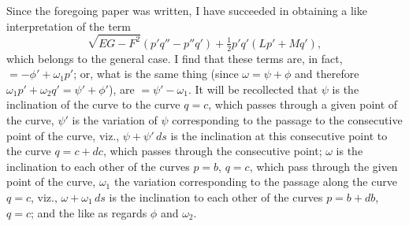 \documentclass[11pt,a4paper]{article}
\theoremstyle{definition}
\begin{document}
Since the foregoing paper was written, I have succeeded in obtaining a like interpretation of the term
\[
\sqrt{EG - F^2}(p'q'' - p''q') + \tfrac{1}{2}p'q'(Lp' + Mq'),
\]
which belongs to the general case. I find that these terms are, in fact, $= -\phi' + \omega_1 p'$; or, what is the same thing (since $\omega = \psi + \phi$ and therefore $\omega_1 p' + \omega_2 q' = \psi' + \phi'$), are $= \psi' - \omega_1$. It will be recollected that $\psi$ is the inclination of the curve to the curve $q = c$, which passes through a given point of the curve, $\psi'$ is the variation of $\psi$ corresponding to the passage to the consecutive point of the curve, viz., $\psi + \psi'\,ds$ is the inclination at this consecutive point to the curve $q = c + dc$, which passes through the consecutive point; $\omega$ is the inclination to each other of the curves $p = b$, $q = c$, which pass through the given point of the curve, $\omega_1$ the variation corresponding to the passage along the curve $q = c$, viz., $\omega + \omega_1\,ds$ is the inclination to each other of the curves $p = b + db$, $q = c$; and the like as regards $\phi$ and $\omega_2$.
\end{document}
